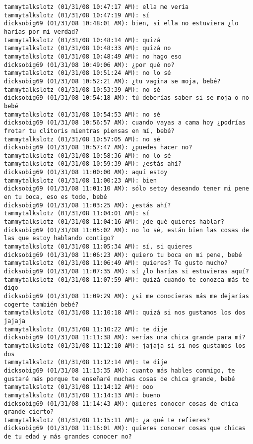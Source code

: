 \begin{verbatim}
tammytalkslotz (01/31/08 10:47:17 AM): ella me vería
tammytalkslotz (01/31/08 10:47:19 AM): sí
dicksobig69 (01/31/08 10:48:01 AM): bien, si ella no estuviera ¿lo harías por mi verdad?
tammytalkslotz (01/31/08 10:48:14 AM): quizá
tammytalkslotz (01/31/08 10:48:33 AM): quizá no
tammytalkslotz (01/31/08 10:48:49 AM): no hago eso
dicksobig69 (01/31/08 10:49:06 AM): ¿por qué no?
tammytalkslotz (01/31/08 10:51:24 AM): no lo sé
dicksobig69 (01/31/08 10:52:21 AM): ¿tu vagina se moja, bebé?
tammytalkslotz (01/31/08 10:53:39 AM): no sé
dicksobig69 (01/31/08 10:54:18 AM): tú deberías saber si se moja o no bebé
tammytalkslotz (01/31/08 10:54:53 AM): no sé
dicksobig69 (01/31/08 10:56:57 AM): cuando vayas a cama hoy ¿podrías frotar tu clitoris mientras piensas en mí, bebé?
tammytalkslotz (01/31/08 10:57:05 AM): no sé
dicksobig69 (01/31/08 10:57:47 AM): ¿puedes hacer no?
tammytalkslotz (01/31/08 10:58:36 AM): no lo sé
tammytalkslotz (01/31/08 10:59:39 AM): ¿estás ahí?
dicksobig69 (01/31/08 11:00:00 AM): aquí estoy 
tammytalkslotz (01/31/08 11:00:23 AM): bien
dicksobig69 (01/31/08 11:01:10 AM): sólo setoy deseando tener mi pene en tu boca, eso es todo, bebé
dicksobig69 (01/31/08 11:03:25 AM): ¿estás ahí?
tammytalkslotz (01/31/08 11:04:01 AM): sí
tammytalkslotz (01/31/08 11:04:16 AM): ¿de qué quieres hablar?
dicksobig69 (01/31/08 11:05:02 AM): no lo sé, están bien las cosas de las que estoy hablando contigo?
tammytalkslotz (01/31/08 11:05:34 AM): sí, si quieres
dicksobig69 (01/31/08 11:06:23 AM): quiero tu boca en mi pene, bebé
tammytalkslotz (01/31/08 11:06:49 AM): quieres? Te gusto mucho?
dicksobig69 (01/31/08 11:07:35 AM): sí ¿lo harías si estuvieras aquí?
tammytalkslotz (01/31/08 11:07:59 AM): quizá cuando te conozca más te digo
dicksobig69 (01/31/08 11:09:29 AM): ¿si me conocieras más me dejarías cogerte también bebé?
tammytalkslotz (01/31/08 11:10:18 AM): quizá si nos gustamos los dos jajaja
tammytalkslotz (01/31/08 11:10:22 AM): te dije
dicksobig69 (01/31/08 11:11:38 AM): serías una chica grande para mí?
tammytalkslotz (01/31/08 11:12:10 AM): jajaja sí si nos gustamos los dos
tammytalkslotz (01/31/08 11:12:14 AM): te dije
dicksobig69 (01/31/08 11:13:35 AM): cuanto más hables conmigo, te gustaré más porque te enseñaré muchas cosas de chica grande, bebé 
tammytalkslotz (01/31/08 11:14:12 AM): ooo
tammytalkslotz (01/31/08 11:14:13 AM): bueno
dicksobig69 (01/31/08 11:14:43 AM): quieres conocer cosas de chica grande cierto?
tammytalkslotz (01/31/08 11:15:11 AM): ¿a qué te refieres?
dicksobig69 (01/31/08 11:16:01 AM): quieres conocer cosas que chicas de tu edad y más grandes conocer no?

\end{verbatim}
